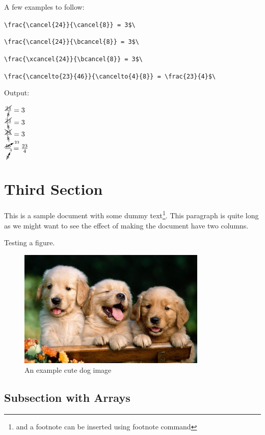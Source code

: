 \documentclass[12]{article}
\begin{document}
    A few examples to follow:

    \verb|\frac{\cancel{24}}{\cancel{8}} = 3$\|

    \verb|\frac{\cancel{24}}{\bcancel{8}} = 3$\|

    \verb|\frac{\xcancel{24}}{\bcancel{8}} = 3$\|

    \verb|\frac{\cancelto{23}{46}}{\cancelto{4}{8}} = \frac{23}{4}$\|

    Output:

    $\frac{\cancel{24}}{\cancel{8}} = 3$   \\
    $\frac{\cancel{24}}{\bcancel{8}} = 3$  \\
    $\frac{\xcancel{24}}{\bcancel{8}} = 3$ \\
    $\frac{\cancelto{23}{46}}{\cancelto{4}{8}} = \frac{23}{4}$ \\

    \section{Third Section}%
    \label{sec:Third Section}

    This is a sample document with some dummy text\footnote{and a footnote can be inserted using footnote command}. This paragraph is quite long as we might want to see the effect of making the document have two columns.


    Testing a figure.
    \begin{figure}[ht]
        \centering
        \includegraphics[width=0.8\textwidth]{Cute-Dog-Photo.jpg}
        \caption{An example cute dog image}
        \label{fig:Cute-Dog-Photo-jpg}
    \end{figure}

    \subsection{Subsection with Arrays}%
    \label{sub:Subsection with Arrays}
\end{document}
